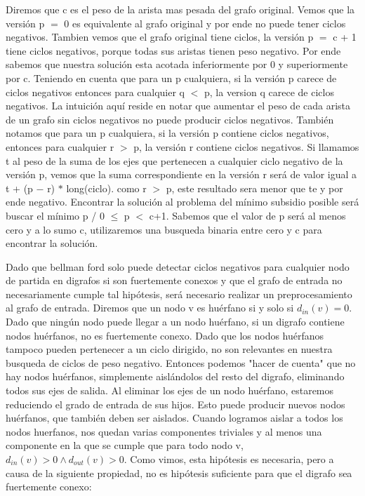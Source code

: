 Diremos que c es el peso de la arista mas pesada del grafo original. Vemos que la versión p $=$ 0 es equivalente al grafo original y por ende no puede tener ciclos negativos. Tambien vemos que el grafo original tiene ciclos, la versión p $=$ c + 1 tiene ciclos negativos, porque todas sus aristas tienen peso negativo. Por ende sabemos que nuestra solución esta acotada inferiormente por 0 y superiormente por c. Teniendo en cuenta que para un p cualquiera, si la versión p carece de ciclos negativos entonces para cualquier q $<$ p, la version q carece de ciclos negativos. La intuición aquí reside en notar que aumentar el peso de cada arista de un grafo sin ciclos negativos no puede producir ciclos negativos. También notamos que para un p cualquiera, si la versión p contiene ciclos negativos, entonces para cualquier r $>$ p, la versión r contiene ciclos negativos. Si llamamos t al peso de la suma de los ejes que pertenecen a cualquier ciclo negativo de la versión p, vemos que la suma correspondiente en la versión r será de valor igual a t + (p $-$ r) $\ast$ long(ciclo). como r $>$ p, este resultado sera menor que te y por ende negativo. Encontrar la solución al problema del mínimo subsidio posible será buscar el mínimo p / 0 $\leq$ p $<$ c+1. Sabemos que el valor de p será al menos cero y a lo sumo c, utilizaremos una busqueda binaria entre cero y c para encontrar la solución.
\\
\par
Dado que bellman ford solo puede detectar ciclos negativos para cualquier nodo de partida en digrafos si son fuertemente conexos y que el grafo de entrada no necesariamente cumple tal hipótesis, será necesario realizar un preprocesamiento al grafo de entrada. Diremos que un nodo v es huérfano si y solo si $d_{in} (v) = 0$. Dado que ningún nodo puede llegar a un nodo huérfano, si un digrafo contiene nodos huérfanos, no es fuertemente conexo. Dado que los nodos huérfanos tampoco pueden pertenecer a un ciclo dirigido, no son relevantes en nuestra busqueda de ciclos de peso negativo. Entonces podemos "hacer de cuenta" que no hay nodos huérfanos, simplemente aislándolos del resto del digrafo, eliminando todos sus ejes de salida. Al eliminar los ejes de un nodo huérfano, estaremos reduciendo el grado de entrada de sus hijos. Esto puede producir nuevos nodos huérfanos, que también deben ser aislados. Cuando logramos aislar a todos los nodos huerfanos, nos quedan varias componentes triviales y al menos una componente en la que se cumple que para todo nodo v, $d_{in} (v) > 0 \land d_{out} (v) > 0$. Como vimos, esta hipótesis es necesaria, pero a causa de la siguiente propiedad, no es hipótesis suficiente para que el digrafo sea fuertemente conexo:
